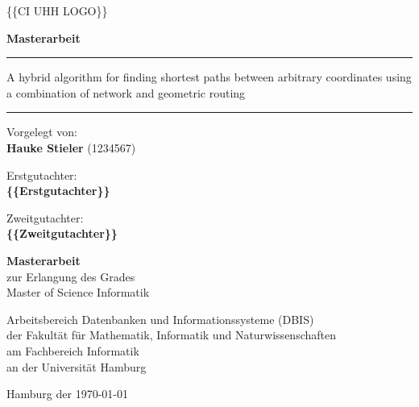 \begin{titlepage}
	\{\{CI UHH LOGO\}\}
	\vspace{1cm}
	
	\begin{center}
		
		{
			\Large
			\textbf{Masterarbeit}
			\par
		}
		
		\vspace{2cm}
		\hrule
		\vspace{1cm}
		
		{\titlefont\huge A hybrid algorithm for finding shortest paths between arbitrary coordinates using a combination of network and geometric routing\par}
		
		\vspace{1cm}
		\hrule
		\vspace{2cm}
	\end{center}
	
	\begin{multicols}{2}
		\raggedright
		Vorgelegt von:\\
		\textbf{Hauke Stieler} (1234567)\\
		
		\columnbreak
		\raggedleft
		
		Erstgutachter:\\
		\textbf{\{\{Erstgutachter\}\}}\par
		\vspace{0.25cm}
		Zweitgutachter:\\
		\textbf{\{\{Zweitgutachter\}\}}\\
	\end{multicols}
	
	\begin{center}
		\vfill
		
		\textbf{Masterarbeit}\\
		zur Erlangung des Grades\\
		Master of Science Informatik
		
		\vfill
		
		Arbeitsbereich Datenbanken und Informationssysteme (DBIS)\\
		der Fakultät für Mathematik, Informatik und Naturwissenschaften\\
		am Fachbereich Informatik\\
		an der Universität Hamburg
		
		
		\vspace{1cm}
		
		{
			Hamburg der \today
		}
	\end{center}
\end{titlepage}
